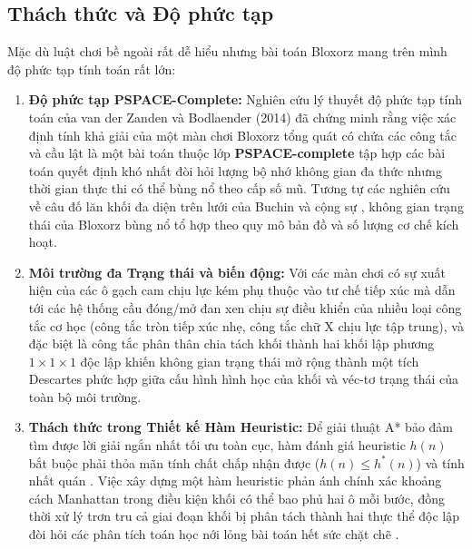 \subsection{Thách thức và Độ phức tạp}
Mặc dù luật chơi bề ngoài rất dễ hiểu nhưng bài toán Bloxorz mang trên mình độ phức
tạp tính toán rất lớn:
\begin{enumerate}[1.]
    \item \textbf{Độ phức tạp PSPACE-Complete:}
    Nghiên cứu lý thuyết độ phức tạp tính toán của van der Zanden và
    Bodlaender (2014) \cite{vanderzanden2014bloxorz} đã chứng minh
    rằng việc xác định tính khả giải của một màn chơi Bloxorz tổng
    quát có chứa các công tắc và cầu lật là một bài toán thuộc lớp
    \textbf{PSPACE-complete} \cite{sipser2013computation, hearn2009games}
     tập hợp các bài toán quyết định khó nhất đòi hỏi lượng bộ nhớ
    không gian đa thức nhưng thời gian thực thi có thể bùng nổ theo cấp
    số mũ. Tương tự các nghiên cứu về câu đố lăn khối đa diện trên lưới
    của Buchin và cộng sự \cite{buchin2007rolling}, không gian trạng
    thái của Bloxorz bùng nổ tổ hợp theo quy mô bản đồ và số lượng cơ
    chế kích hoạt.

    \item \textbf{Môi trường đa Trạng thái và biến động:}
    Với các màn chơi có sự xuất hiện của các ô gạch cam chịu lực kém
    phụ thuộc vào tư chế tiếp xúc mà dẫn tới các hệ thống cầu đóng/mở
    đan xen chịu sự điều khiển của nhiều loại công tắc cơ học (công tắc
    tròn tiếp xúc nhẹ, công tắc chữ X chịu lực tập trung), và đặc biệt
    là công tắc phân thân chia tách khối thành hai khối lập phương
    $1 \times 1 \times 1$ độc lập khiến không gian trạng thái mở rộng
    thành một tích Descartes phức hợp giữa cấu hình hình học của khối
    và véc-tơ trạng thái của toàn bộ môi trường.

    \item \textbf{Thách thức trong Thiết kế Hàm Heuristic:}
    Để giải thuật A* \cite{hart1968astar} bảo đảm tìm được lời giải ngắn
    nhất tối ưu toàn cục, hàm đánh giá heuristic $h(n)$ bắt buộc phải
    thỏa mãn tính chất chấp nhận được ($h(n) \le h^*(n)$) và tính nhất
    quán \cite{dechter1985astar}. Việc xây dựng một hàm heuristic phản
    ánh chính xác khoảng cách Manhattan trong điều kiện khối có thể bao
    phủ hai ô mỗi bước, đồng thời xử lý trơn tru cả giai đoạn khối bị
    phân tách thành hai thực thể độc lập đòi hỏi các phân tích toán học
    nới lỏng bài toán hết sức chặt chẽ \cite{pearl1984heuristics}.
\end{enumerate}

